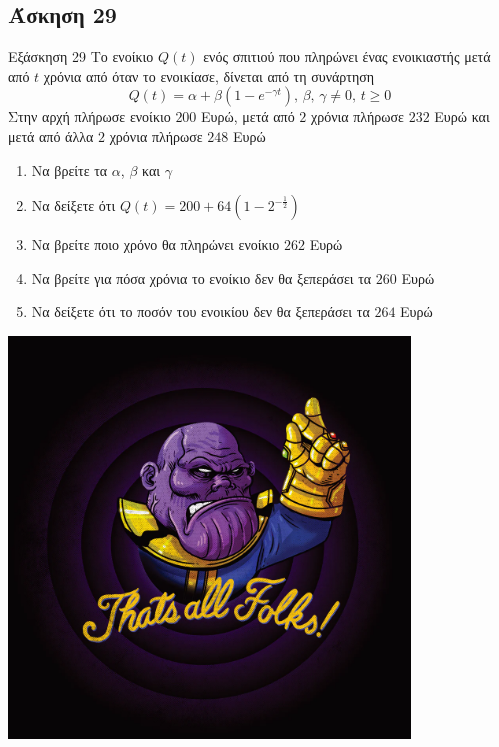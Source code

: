 \documentclass[greek]{beamer}
\begin{document}
\subsection{Άσκηση 29}
\begin{frame}[label=Άσκηση29,t]{Εξάσκηση 29}
  Το ενοίκιο $Q(t)$ ενός σπιτιού που πληρώνει ένας ενοικιαστής μετά από $t$ χρόνια από όταν το ενοικίασε, δίνεται από τη συνάρτηση
  $$Q(t)=α+β(1-e^{-γt}) \text{, } β \text{, } γ\ne 0\text{, } t\ge 0$$
  Στην αρχή πλήρωσε ενοίκιο $200$ Ευρώ, μετά από $2$ χρόνια πλήρωσε $232$ Ευρώ και μετά από άλλα $2$ χρόνια πλήρωσε $248$ Ευρώ
  \begin{enumerate}
    \item<1-> Να βρείτε τα $α$, $β$ και $γ$
    \item<2-> Να δείξετε ότι $Q(t)=200+64\left( 1-2^{-\frac{1}{2}} \right) $
    \item<3-> Να βρείτε ποιο χρόνο θα πληρώνει ενοίκιο $262$ Ευρώ
    \item<4-> Να βρείτε για πόσα χρόνια το ενοίκιο δεν θα ξεπεράσει τα $260$ Ευρώ
    \item<5-> Να δείξετε ότι το ποσόν του ενοικίου δεν θα ξεπεράσει τα $264$ Ευρώ
  \end{enumerate}

\end{frame}

\begin{frame}
  \centering
  \includegraphics[width=0.8\textwidth]{"./images/thatsall.png"}

\end{frame}
\end{document}
